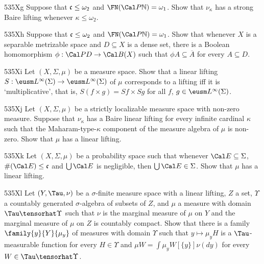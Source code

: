 {\spheader 535Xg Suppose that $\frak c\le\omega_2$ and
$\FN(\Cal P\Bbb N)=\omega_1$.   Show that $\nu_{\kappa}$ has a strong
Baire lifting whenever $\kappa\le\omega_2$.   

\spheader 535Xh Suppose that $\frak c\le\omega_2$ and
$\FN(\Cal P\Bbb N)=\omega_1$.   Show that
whenever $X$ is a separable metrizable space and $D\subseteq X$ is a
dense set, there is a Boolean homomorphism $\phi:\Cal PD\to\Cal B(X)$
such that $\phi A\subseteq\overline{A}$ for every $A\subseteq D$.

\spheader 535Xi Let $(X,\Sigma,\mu)$ be a measure space.   Show that a
linear lifting $S:\eusm L^{\infty}(\Sigma)\to\eusm L^{\infty}(\Sigma)$
of $\mu$ corresponds to a lifting iff it is `multiplicative', that is,
$S(f\times g)=Sf\times Sg$ for all $f$, $g\in\eusm L^{\infty}(\Sigma)$.

\spheader 535Xj Let $(X,\Sigma,\mu)$ be a strictly localizable measure
space with non-zero measure.   Suppose that $\nu_{\kappa}$ has a Baire
linear lifting for every infinite cardinal $\kappa$ such that the
Maharam-type-$\kappa$ component of the measure algebra of $\mu$ is
non-zero.   Show that $\mu$ has a linear lifting.

\spheader 535Xk Let $(X,\Sigma,\mu)$ be a probability space such that
whenever $\Cal E\subseteq\Sigma$, $\#(\Cal E)\le\frak c$ and
$\bigcup\Cal E$ is negligible, then $\bigcup\Cal E\in\Sigma$.   Show
that $\mu$ has a linear lifting.   

\spheader 535Xl Let $(Y,\Tau,\nu)$ be a $\sigma$-finite measure space
with a linear lifting, $Z$ a set, $\Upsilon$ a countably generated
$\sigma$-algebra of subsets of $Z$, and $\mu$ a measure with domain
$\Tau\tensorhat\Upsilon$ such that $\nu$ is the marginal measure of
$\mu$ on $Y$ and the marginal measure of $\mu$ on $Z$ is countably compact.
Show that there is a family
$\family{y}{Y}{\mu_y}$ of measures with domain $\Upsilon$ such that
$y\mapsto\mu_yH$ is a $\Tau$-measurable function for every
$H\in\Upsilon$ and $\mu W=\int\mu_yW[\{y\}]\nu(dy)$ for every
$W\in\Tau\tensorhat\Upsilon$.

}
